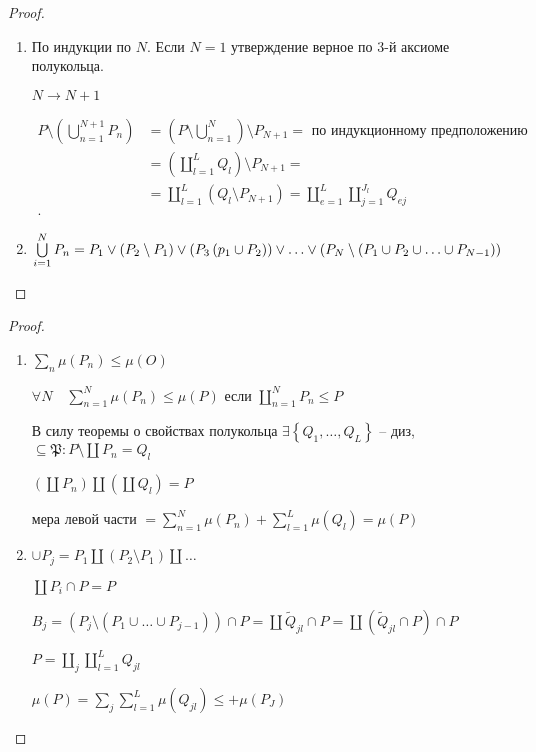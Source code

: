 \documentclass{book}
\newcommand{\tl}[1]{\widetilde{#1}}
\theoremstyle{definition}
\begin{document}
\begin{proof}
    \begin{enumerate}
        \item  По индукции по $N$. Если  $N=1$ утверждение верное по 3-й аксиоме полукольца.

             $N \to N+1$

            \begin{align*}
                P \setminus \left( \bigcup\limits_{n=1}^{N+1}P_n  \right)  &= \left( P \setminus \bigcup\limits_{n=1}^{N}  \right) \setminus P_{N+1} = \text{ по индукционному предположению}\\
                &=\left( \coprod_{l=1}^L Q_l \right) \setminus P_{N+1} = \\
                &= \coprod_{l=1} ^L\left( Q_l \setminus  P_{N+1} \right)  = \coprod_{e=1}^L \coprod_{j=1}^{J_l} Q_{ej}\\
            .\end{align*}               
        \item $\bigcup\limits_{i=1} ^N P_n = P_1 \vee \left( P_2\setminus P_1 \right) \vee \left( P_3 \\ \left( p_1 \cup P_2 \right)  \right) \vee \ldots \vee \left( P_N \setminus  \left( P_1 \cup P_2 \cup  \ldots \cup  P_{N-1} \right)  \right) $
    \end{enumerate}
\end{proof}
\begin{proof}
    \begin{enumerate}
        \item 
    $\sum_n\mu(P_n) \leqslant \mu(O)$

    $\forall N\quad \sum_{n=1}^{N} \mu(P_n) \leqslant \mu(P)$ если $\coprod_{n=1}^N P_n \leqslant  P$

    В силу теоремы о свойствах полукольца $\exists \left\{ Q_1, \ldots, Q_L \right\} $ -- диз, $\subseteq \mathfrak P: P\setminus \coprod P_n = Q_l$

    $\left(\coprod P_n\right) \coprod \left( \coprod Q_l \right)  = P$

    мера левой части $= \sum_{n=1}^{N} \mu(P_n) + \sum_{l=1}^{L} \mu(Q_l) = \mu(P)$
\item $\cup P_j = P_1 \coprod \left( P_2 \setminus  P_1 \right) \coprod \ldots$

    $\coprod P_i \cap P = P$

    $B_j = \left( P_j \setminus  \left( P_1 \cup \ldots \cup  P_{j-1} \right)  \right) \cap P = \coprod \tl Q_{jl} \cap P = \coprod \left( \tl Q_{jl}\cap P \right) \cap P$

    $P = \coprod_j \coprod _{l=1}^L Q_{jl}$

    $\mu(P) =\sum_j\sum_{l=1}^L \mu(Q_{jl}) \leqslant +\mu(P_J)$
    \end{enumerate}
\end{proof}

































 
\end{document}
